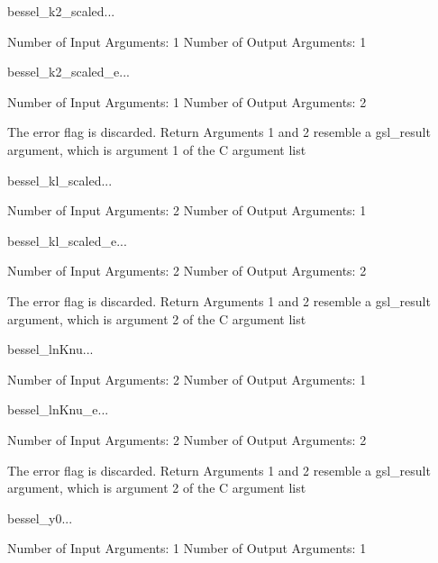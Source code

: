 \begin{funcdesc}{bessel_k2_scaled}{...}

    Number of Input  Arguments:  1
    Number of Output Arguments:  1
\end{funcdesc}

\begin{funcdesc}{bessel_k2_scaled_e}{...}

    Number of Input  Arguments:  1
    Number of Output Arguments:  2

The error flag is discarded.
Return Arguments 1 and 2 resemble a gsl_result argument,
	which is  argument 1 of the C argument list

\end{funcdesc}

\begin{funcdesc}{bessel_kl_scaled}{...}

    Number of Input  Arguments:  2
    Number of Output Arguments:  1
\end{funcdesc}

\begin{funcdesc}{bessel_kl_scaled_e}{...}

    Number of Input  Arguments:  2
    Number of Output Arguments:  2

The error flag is discarded.
Return Arguments 1 and 2 resemble a gsl_result argument,
	which is  argument 2 of the C argument list

\end{funcdesc}

\begin{funcdesc}{bessel_lnKnu}{...}

    Number of Input  Arguments:  2
    Number of Output Arguments:  1
\end{funcdesc}

\begin{funcdesc}{bessel_lnKnu_e}{...}

    Number of Input  Arguments:  2
    Number of Output Arguments:  2

The error flag is discarded.
Return Arguments 1 and 2 resemble a gsl_result argument,
	which is  argument 2 of the C argument list

\end{funcdesc}

\begin{funcdesc}{bessel_y0}{...}

    Number of Input  Arguments:  1
    Number of Output Arguments:  1
\end{funcdesc}

